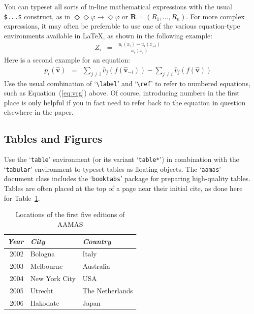 \documentclass[sigconf,anonymous]{aamas}
\begin{document}
You can typeset all sorts of in-line mathematical expressions 
with the usual \verb|$...$| construct, as in 
$\Diamond\Diamond\varphi \rightarrow \Diamond\varphi$ or 
$\boldsymbol{R} = (R_1,\ldots,R_n)$.
For more complex expressions, it may often be preferable to use one of
the various equation-type environments available in \LaTeX\@, as shown 
in the following example:
%
\begin{eqnarray}
Z_i & = & \frac{u_i(x_i) - u_i(x_{-i})}{u_i(x_i)}
\end{eqnarray}
%
Here is a second example for an equation: 
%
\begin{eqnarray}\label{eq:vcg}
p_i(\boldsymbol{\hat{v}}) & = &
\sum_{j \neq i} \hat{v}_j(f(\boldsymbol{\hat{v}}_{-i})) - 
\sum_{j \neq i} \hat{v}_j(f(\boldsymbol{\hat{v}})) 
\end{eqnarray}
%
Use the usual combination of `\verb|\label|' and `\verb|\ref|' to refer
to numbered equations, such as Equation~(\ref{eq:vcg}) above. Of course,
introducing numbers in the first place is only helpful if you in fact 
need to refer back to the equation in question elsewhere in the paper.


\subsection{Tables and Figures}

Use the `\texttt{table}' environment (or its variant `\texttt{table*}')
in combination with the `\texttt{tabular}' environment to typeset tables
as floating objects. The `\texttt{aamas}' document class includes the 
`\texttt{booktabs}' package for preparing high-quality tables. Tables 
are often placed at the top of a page near their initial cite, as done 
here for Table~\ref{tab:locations}.

\begin{table}[t]
	\caption{Locations of the first five editions of AAMAS}
	\label{tab:locations}
	\begin{tabular}{rll}\toprule
		\textit{Year} & \textit{City} & \textit{Country} \\ \midrule
		2002 & Bologna & Italy \\
		2003 & Melbourne & Australia \\
		2004 & New York City & USA \\
		2005 & Utrecht & The Netherlands \\
		2006 & Hakodate & Japan \\ \bottomrule
	\end{tabular}
\end{table}
\end{document}
